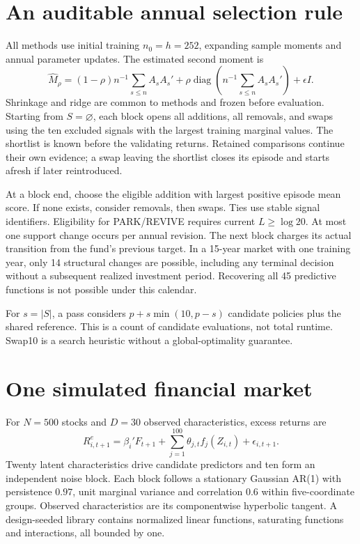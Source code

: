 \documentclass[11pt,a4paper]{article}
\theoremstyle{remark}\newtheorem{remark}[theorem]{Remark}
\begin{document}
\section{An auditable annual selection rule}
All methods use initial training $n_0=h=252$, expanding sample moments and
annual parameter updates. The estimated second moment is
\begin{equation}
 \widehat M_\rho=(1-\rho)n^{-1}\sum_{s\le n}A_sA_s'
       +\rho\operatorname{diag}\!\left(n^{-1}\sum_{s\le n}A_sA_s'\right)
       +\epsilon I.
\end{equation}
Shrinkage and ridge are common to methods and frozen before evaluation.
Starting from $S=\varnothing$, each block opens all additions, all removals,
and swaps using the ten excluded signals with the largest training marginal
values. The shortlist is known before the validating returns. Retained
comparisons continue their own evidence; a swap leaving the shortlist closes
its episode and starts afresh if later reintroduced.

At a block end, choose the eligible addition with largest positive episode
mean score. If none exists, consider removals, then swaps. Ties use stable
signal identifiers. Eligibility for PARK/REVIVE requires current
$L\ge\log20$. At most one support change occurs per annual revision.
The next block charges its actual transition from the fund's previous target.
In a 15-year market with one training year, only 14 structural changes are
possible, including any terminal decision without a subsequent realized
investment period. Recovering all 45 predictive functions is not possible
under this calendar.

For $s=|S|$, a pass considers $p+s\min(10,p-s)$ candidate policies plus the
shared reference. This is a count of candidate evaluations, not total runtime.
Swap10 is a search heuristic without a global-optimality guarantee.

\section{One simulated financial market}
For $N=500$ stocks and $D=30$ observed characteristics, excess returns are
\begin{equation}
 R^e_{i,t+1}=\beta_i'F_{t+1}+\sum_{j=1}^{100}\theta_{j,t}f_j(Z_{i,t})
       +\epsilon_{i,t+1}.
\end{equation}
Twenty latent characteristics drive candidate predictors and ten form an
independent noise block. Each block follows a stationary Gaussian AR(1) with
persistence $0.97$, unit marginal variance and correlation $0.6$ within
five-coordinate groups. Observed characteristics are its componentwise
hyperbolic tangent. A design-seeded library contains normalized linear
functions, saturating functions and interactions, all bounded by one.
\end{document}
